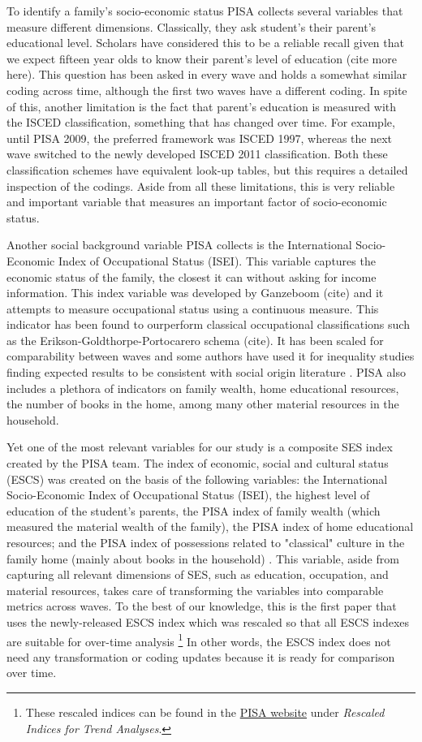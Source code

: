 \documentclass[11pt, a4paper]{article}\usepackage[]{graphicx}\usepackage[]{color}
\begin{document}
To identify a family's socio-economic status PISA collects several variables that measure different dimensions. Classically, they ask student's their parent's educational level. Scholars have considered this to be a reliable recall given that we expect fifteen year olds to know their parent's level of education \citep{reardon2011}(cite more here). This question has been asked in every wave and holds a somewhat similar coding across time, although the first two waves have a different coding. In spite of this, another limitation is the fact that parent's education is measured with the ISCED classification, something that has changed over time. For example, until PISA 2009, the preferred framework was ISCED 1997, whereas the next wave switched to the newly developed ISCED 2011 classification. Both these classification schemes have equivalent look-up tables, but this requires a detailed inspection of the codings. Aside from all these limitations, this is very reliable and important variable that measures an important factor of socio-economic status.

Another social background variable PISA collects is the International Socio-Economic Index of Occupational Status (ISEI). This variable captures the economic status of the family, the closest it can without asking for income information.  This index variable was developed by Ganzeboom (cite) and it attempts to measure occupational status using a continuous measure. This indicator has been found to ourperform classical occupational classifications such as the Erikson-Goldthorpe-Portocarero schema (cite). It has been scaled for comparability between waves and some authors have used it for inequality studies finding expected results to be consistent with social origin literature \citep{anna2016_global}. PISA also includes a plethora of indicators on family wealth, home educational resources, the number of books in the home, among many other material resources in the household.

Yet one of the most relevant variables for our study is a composite SES index created by the PISA team. The index of economic, social and cultural status (ESCS) was created on the basis of the following variables: the International Socio-Economic Index of Occupational Status (ISEI), the highest level of education of the student’s parents, the PISA index of family wealth (which measured the material wealth of the family), the PISA index of home educational resources; and the PISA index of possessions related to "classical" culture in the family home (mainly about books in the household) \citep{oecd_glance_2002}. This variable, aside from capturing all relevant dimensions of SES, such as education, occupation, and material resources, takes care of transforming the variables into comparable metrics across waves. To the best of our knowledge, this is the first paper that uses the newly-released ESCS index \citep{pisa_2015_results} which was rescaled so that all ESCS indexes are suitable for over-time analysis \footnote{These rescaled indices can be found in the \href{http://www.oecd.org/pisa/data/2015database/}{PISA website} under \emph{Rescaled Indices for Trend Analyses}.} In other words, the ESCS index does not need any transformation or coding updates because it is ready for comparison over time.
\end{document}
